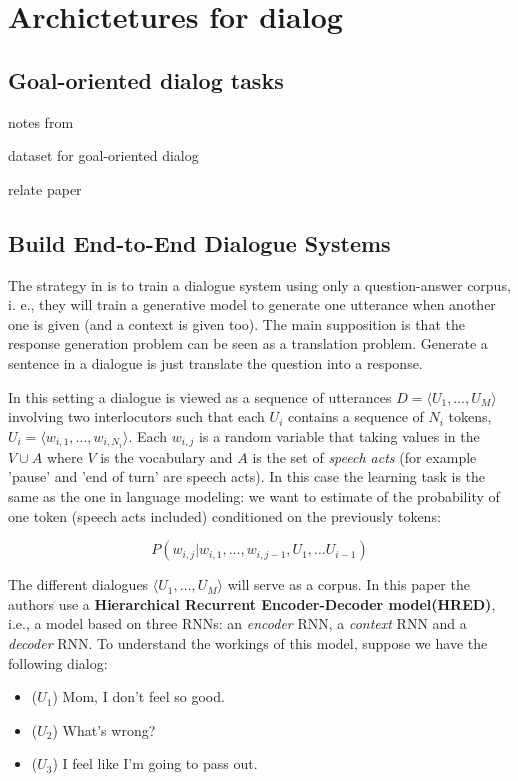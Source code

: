 \chapter{Archictetures for dialog}\label{architectures}

\section{Goal-oriented dialog tasks}

notes from %

dataset for goal-oriented dialog %

relate paper %



\section{Build End-to-End Dialogue Systems} 

The strategy in \cite{Serban:2016a} is to train a dialogue system using only a question-answer corpus, i. e., they will train a generative model to generate one utterance when another one is given (and a context is given too). The main supposition is that the response generation problem can be seen as a translation problem. Generate a sentence in a dialogue is just translate the question into a response.

\par In this setting a dialogue is viewed as a sequence of utterances $D=\langle U_1 , \dots, U_M \rangle$ involving two interlocutors such that each $U_i$ contains a sequence of $N_i$ tokens, $U_i = \langle w_{i,1} , \dots, w_{i,N_{i}} \rangle$. Each $w_{i,j}$ is a random variable that taking values in the $V\cup A$ where $V$ is the vocabulary and $A$ is the set of \textit{speech acts} (for example 'pause' and 'end of turn' are  speech acts). In this case the learning task is the same as the one in language modeling: we want to estimate of the probability of one token (speech acts included) conditioned on the previously tokens:

\begin{equation}
P(w_{i,j} | w_{i,1}, \dots , w_{i,j-1}, U_{1}, \dots U_{i-1})
\end{equation}

The different dialogues $\langle U_1 , \dots, U_M \rangle$ will serve as a corpus.
In this paper the authors use a \textbf{Hierarchical Recurrent Encoder-Decoder model(HRED)}, i.e., a model based on three RNNs: an \textit{encoder} RNN, a \textit{context} RNN and a \textit{decoder} RNN.  To understand the workings of this model, suppose we have the following dialog:
\begin{itemize}
\item ($U_1$) Mom, I don't feel so good.\\
\item ($U_2$) What's wrong?\\
\item ($U_3$) I feel like I'm going to pass out.
\end{itemize}

